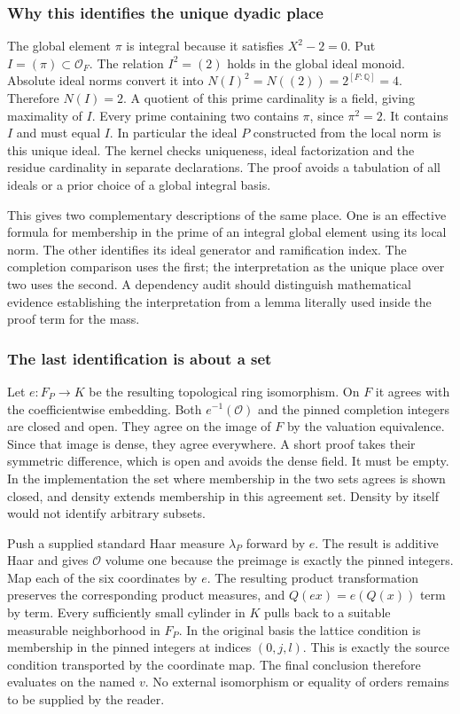 \documentclass[12pt,letterpaper]{article}
\newcommand{\code}[1]{\texttt{\detokenize{#1}}}
\begin{document}
\subsubsection{Why this identifies the unique dyadic place}
The global element $\pi$ is integral because it satisfies $X^2-2=0$. Put $I=(\pi)\subset\mathcal O_F$. The relation $I^2=(2)$ holds in the global ideal monoid. Absolute ideal norms convert it into $N(I)^2=N((2))=2^{[F:\mathbb Q]}=4$. Therefore $N(I)=2$. A quotient of this prime cardinality is a field, giving maximality of $I$. Every prime containing two contains $\pi$, since $\pi^2=2$. It contains $I$ and must equal $I$. In particular the ideal $P$ constructed from the local norm is this unique ideal. The kernel checks uniqueness, ideal factorization and the residue cardinality in separate declarations. The proof avoids a tabulation of all ideals or a prior choice of a global integral basis.
\par
This gives two complementary descriptions of the same place. One is an effective formula for membership in the prime of an integral global element using its local norm. The other identifies its ideal generator and ramification index. The completion comparison uses the first; the interpretation as the unique place over two uses the second. A dependency audit should distinguish mathematical evidence establishing the interpretation from a lemma literally used inside the proof term for the mass.
\subsubsection{The last identification is about a set}
Let $e:F_P\to K$ be the resulting topological ring isomorphism. On $F$ it agrees with the coefficientwise embedding. Both $e^{-1}(\mathcal O)$ and the pinned completion integers are closed and open. They agree on the image of $F$ by the valuation equivalence. Since that image is dense, they agree everywhere. A short proof takes their symmetric difference, which is open and avoids the dense field. It must be empty. In the implementation the set where membership in the two sets agrees is shown closed, and density extends membership in this agreement set. Density by itself would not identify arbitrary subsets.
\par
Push a supplied standard Haar measure $\lambda_P$ forward by $e$. The result is additive Haar and gives $\mathcal O$ volume one because the preimage is exactly the pinned integers. Map each of the six coordinates by $e$. The resulting product transformation preserves the corresponding product measures, and $Q(e x)=e(Q(x))$ term by term. Every sufficiently small cylinder in $K$ pulls back to a suitable measurable neighborhood in $F_P$. In the original basis the lattice condition is membership in the pinned integers at indices $(0,j,l)$. This is exactly the source condition transported by the coordinate map. The final conclusion therefore evaluates \code{latV gb v} on the named $v$. No external isomorphism or equality of orders remains to be supplied by the reader.
\end{document}
